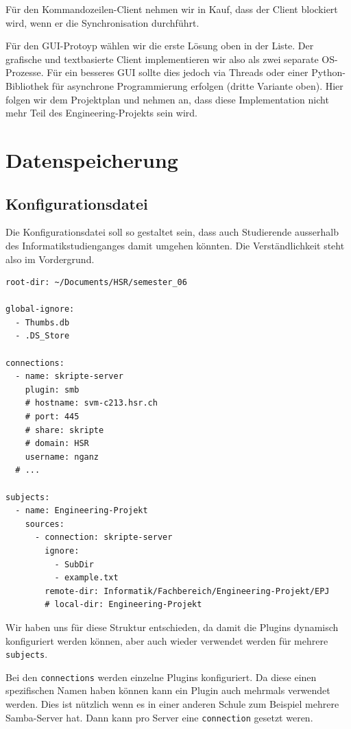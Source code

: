 \documentclass[a4paper]{article}
\let\oldsection\section
\renewcommand\section{\clearpage\oldsection}
\begin{document}
Für den Kommandozeilen-Client nehmen wir in Kauf, dass der Client blockiert wird, wenn er die Synchronisation durchführt.

Für den GUI-Protoyp wählen wir die erste Lösung oben in der Liste. Der grafische und textbasierte Client implementieren wir also als zwei separate OS-Prozesse. Für ein besseres GUI sollte dies jedoch via Threads oder einer Python-Bibliothek für asynchrone Programmierung erfolgen (dritte Variante oben). Hier folgen wir dem Projektplan und nehmen an, dass diese Implementation nicht mehr Teil des Engineering-Projekts sein wird.

\section{Datenspeicherung}

\subsection{Konfigurationsdatei}
Die Konfigurationsdatei soll so gestaltet sein, dass auch Studierende ausserhalb des Informatikstudienganges damit umgehen könnten. Die Verständlichkeit steht also im Vordergrund.

\begin{verbatim}
root-dir: ~/Documents/HSR/semester_06

global-ignore:
  - Thumbs.db
  - .DS_Store

connections:
  - name: skripte-server
    plugin: smb
    # hostname: svm-c213.hsr.ch
    # port: 445
    # share: skripte
    # domain: HSR
    username: nganz
  # ...

subjects:
  - name: Engineering-Projekt
    sources:
      - connection: skripte-server
        ignore:
          - SubDir
          - example.txt
        remote-dir: Informatik/Fachbereich/Engineering-Projekt/EPJ
        # local-dir: Engineering-Projekt
\end{verbatim}

Wir haben uns für diese Struktur entschieden, da damit die Plugins dynamisch konfiguriert werden können, aber auch wieder verwendet werden für mehrere \verb|subjects|.

Bei den \verb|connections| werden einzelne Plugins konfiguriert.
Da diese einen spezifischen Namen haben können kann ein Plugin auch mehrmals verwendet werden.
Dies ist nützlich wenn es in einer anderen Schule zum Beispiel mehrere Samba-Server hat.
Dann kann pro Server eine \verb|connection| gesetzt weren.
\end{document}
